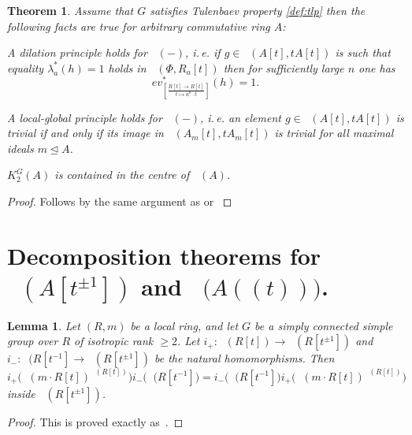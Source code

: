 \documentclass[oneside,12pt]{amsart}
\newtheorem{thm}{Theorem}
\numberwithin{equation}{section}
\newtheorem{lem}{Lemma}
\numberwithin{lem}{section}
\theoremstyle{definition}
\theoremstyle{remark}
\DeclareMathOperator{\St}{St^G}
\newcommand{\eval}[4]{ev_{\scriptstyle \left[\frac{#2[#1] \rightarrow #3}{#1 \mapsto #4}\right]}}
\newcommand{\ev}[3]{\eval{t}{#1}{#2}{#3}}
\begin{document}
\begin{thm} Assume that $G$ satisfies Tulenbaev property \eqref{def:tlp} then the following facts are true for arbitrary commutative ring $A$:
\begin{thmlist}
 \item \label{thm:dp} A dilation principle holds for $\St(-)$, i.\,e. if $g\in\St(A[t], tA[t])$ is such that equality $\lambda_a^*(h) = 1$ holds in $\St(\Phi, R_a[t])$ then
       for sufficiently large $n$ one has $$\ev{R}{R[t]}{a^n\cdot t}^*(h) = 1.$$
 \item \label{thm:lg-k2} A local-global principle holds for $\St(-)$, i.\,e. an element $g \in \St(A[t], tA[t])$ is trivial if and only if its image in 
                         $\St(A_m[t], tA_m[t])$ is trivial for all maximal ideals $m \trianglelefteq A$.
 \item \label{thm:centr} $K_2^G(A)$ is contained in the centre of $\St(A)$.
\end{thmlist}


\end{thm}
\begin{proof} Follows by the same argument as \cite[Theorem~2.1]{Tu} or \cite[Theorem~2]{S15} \end{proof}


\section{Decomposition theorems for \texorpdfstring{$\St(A[t^{\pm 1}])$}{St(A[t, t\textminussuperior\textonesuperior])} and \texorpdfstring{$\St\bigl(A((t))\bigr)$}{St(A((t)))}.}

\begin{lem}
 Let $(R,m)$ be a local ring, and let $G$ be a simply connected simple group over $R$
of isotropic rank $\ge 2$. Let $i_+:\St(R[t])\to\St(R[t^{\pm 1}])$ and $i_-:\St(R[t^{-1}]\to
\St(R[t^{\pm 1}])$ be the natural homomorphisms.
Then
$$
i_+\bigl(\St(m\cdot R[t])^{\St(R[t])}\bigr)i_-\bigl(\St(R[t^{-1}]\bigr)=i_-\bigl(\St(R[t^{-1}]\bigr)
i_+\bigl(\St(m\cdot R[t])^{\St(R[t])}\bigr)
$$
inside $\St(R[t^{\pm 1}])$.
\end{lem}
\begin{proof}
This is proved exactly as~\cite[Lemma 5.12]{St-poly}.
\end{proof}
\end{document}
